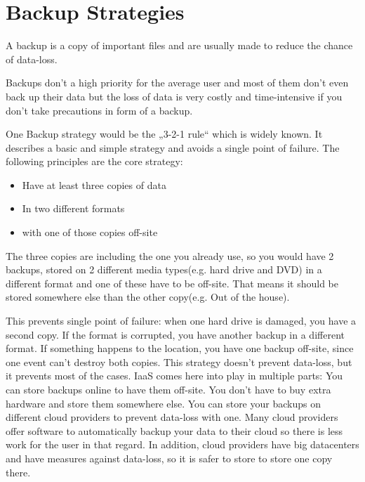 \section{Backup Strategies}
A backup is a copy of important files and are usually made to reduce the chance of data-loss.

Backups don't a high priority for the average user and most of them don't even back up their data 
\cite{stat_backup} but the loss of data is very costly and time-intensive if you don't take precautions in form of a backup.

One Backup strategy would be the „3-2-1 rule“ which is widely known. It describes a basic and simple strategy and avoids a single point of failure.
The following principles are the core strategy:
\begin{itemize}
	\itemsep0em 
	\item Have at least three copies of data
	\item In two different formats
	\item with one of those copies off-site
\end{itemize}
The three copies are including the one you already use, so you would have 2 backups, stored on 2 different media types(e.g. hard drive and DVD) in a different format and one of these have to be off-site. That means it should be stored somewhere else than the other copy(e.g. Out of the house).

This prevents single point of failure: when one hard drive is damaged, you have a second copy. If the format is corrupted, you have another backup in a different format. If something happens to the location, you have one backup off-site, since one event can't destroy both copies.
This strategy doesn't prevent data-loss, but it prevents most of the cases.
\cite{micro_2013}
IaaS comes here into play in multiple parts: You can store backups online to have them off-site. You don't have to buy extra hardware and store them somewhere else. You can store your backups on different cloud providers to prevent data-loss with one. Many cloud providers offer software to automatically backup your data to their cloud so there is less work for the user in that regard. In addition, cloud providers have big datacenters and have measures against data-loss, so it is safer to store to store one copy there.
\cite{google_centers}

